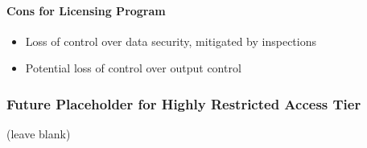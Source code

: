 \paragraph{Cons for Licensing Program}

\begin{itemize}
    \item Loss of control over data security, mitigated by inspections
    \item Potential loss of control over output control
\end{itemize}




 

\subsubsection{Future Placeholder for Highly Restricted Access Tier}
(leave blank)

